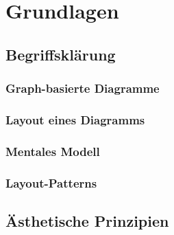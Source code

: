
\chapter{Grundlagen}

\section{Begriffsklärung}

\subsection{Graph-basierte Diagramme}
\label{subsec:graph-based-diagrams}


\subsection{Layout eines Diagramms}



\subsection{Mentales Modell}
\label{subsec:mental-map}

\cite{Branke01Dynamic} 

\subsection{Layout-Patterns}

% 

\section{Ästhetische Prinzipien}
\label{sec:aesthetics-criteria}





